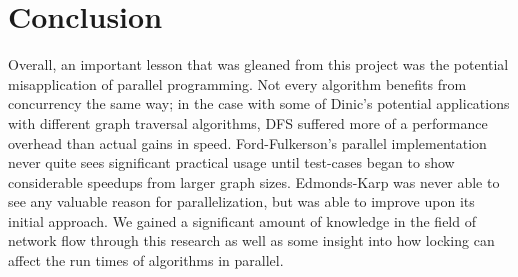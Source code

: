 \section{Conclusion}

Overall, an important lesson that was gleaned from this project was the potential misapplication of parallel programming. Not every algorithm benefits from concurrency the same way; in the case with some of Dinic's potential applications with different graph traversal algorithms, DFS suffered more of a performance overhead than actual gains in speed. Ford-Fulkerson's parallel implementation never quite sees significant practical usage until test-cases began to show considerable speedups from larger graph sizes. Edmonds-Karp was never able to see any valuable reason for parallelization, but was able to improve upon its initial approach. We gained a significant amount of knowledge in the field of network flow through this research as well as some insight into how locking can affect the run times of algorithms in parallel. 